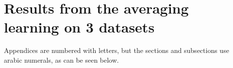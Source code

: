 \chapter{Results from the averaging learning on 3 datasets}
\label{app:C}
Appendices are numbered with letters, but the sections and subsections use
arabic numerals, as can be seen below.

%
%


